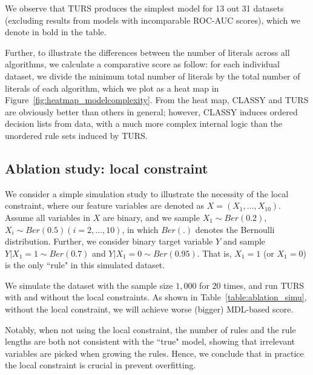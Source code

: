 We observe that TURS produces the simplest model for 13 out 31 datasets (excluding results from models with incomparable ROC-AUC scores), which we denote in bold in the table. 

Further, to illustrate the differences between the number of literals across all algorithms, we calculate a comparative score as follow: for each individual dataset, we divide the minimum total number of literals by the total number of literals of each algorithm, which we plot as a heat map in Figure~\ref{fig:heatmap_modelcomplexity}. From the heat map, CLASSY and TURS are obviously better than others in general; however, CLASSY induces ordered decision lists from data, with a much more complex internal logic than the unordered rule sets induced by TURS. 


\subsection{Ablation study: local constraint}
We consider a simple simulation study to illustrate the necessity of the local constraint, where our feature variables are denoted as $X = (X_1, ..., X_{10})$. Assume all variables in $X$ are binary, and we sample $X_1 \sim Ber(0.2)$, $X_i \sim Ber(0.5) (i = 2, ..., 10)$, in which $Ber(.)$ denotes the Bernoulli distribution. Further, we consider binary target variable $Y$ and sample $Y|X_1 = 1 \sim Ber(0.7)$ and $Y|X_1 = 0 \sim Ber(0.95)$. That is, $X_1 = 1$ (or $X_1 = 0$) is the only ``rule" in this simulated dataset. 

We simulate the dataset with the sample size $1,000$ for $20$ times, and run TURS with and without the local constraints. As shown in Table~\ref{table:ablation_simu}, without the local constraint, we will achieve worse (bigger) MDL-based score. 

Notably, when not using the local constraint, the number of rules  and the rule lengths are both not consistent with the ``true" model, showing that irrelevant variables are picked when growing the rules. Hence, we conclude that in practice the local constraint is crucial in prevent overfitting. 

